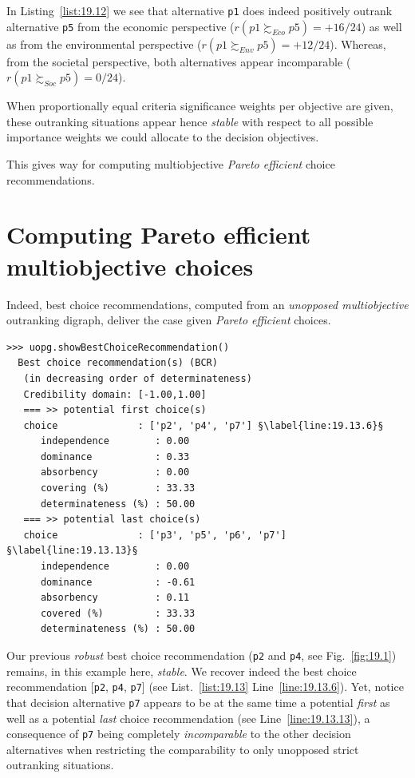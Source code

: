 In Listing~\vref{list:19.12} we see that alternative \texttt{p1} does indeed positively outrank alternative \texttt{p5} from the economic perspective ($r(p1 \succsim_{Eco} p5) = +16/24$) as well as from the environmental perspective ($r(p1 \succsim_{Env} p5) = +12/24$). Whereas, from the societal perspective, both alternatives appear incomparable ($r(p1 \succsim_{Soc} p5) = 0/24$).

When proportionally equal criteria significance weights per objective are given, these outranking situations appear hence \emph{stable} with respect to all possible importance weights we could allocate to the decision objectives.

This gives way for computing multiobjective \emph{Pareto efficient} choice recommendations. 

\section{Computing Pareto efficient multiobjective choices}
\label{sec:19.6}

Indeed, best choice recommendations, computed from an \emph{unopposed multiobjective} outranking digraph, deliver the case given \emph{Pareto efficient} choices. 
\begin{lstlisting}[caption={Pareto efficient multiobjective choice},label=list:19.13]
>>> uopg.showBestChoiceRecommendation()
  Best choice recommendation(s) (BCR)
   (in decreasing order of determinateness)   
   Credibility domain: [-1.00,1.00]
   === >> potential first choice(s)
   choice              : ['p2', 'p4', 'p7'] §\label{line:19.13.6}§
      independence        : 0.00
      dominance           : 0.33
      absorbency          : 0.00
      covering (%)        : 33.33
      determinateness (%) : 50.00
   === >> potential last choice(s) 
   choice              : ['p3', 'p5', 'p6', 'p7'] §\label{line:19.13.13}§
      independence        : 0.00
      dominance           : -0.61
      absorbency          : 0.11
      covered (%)         : 33.33
      determinateness (%) : 50.00
\end{lstlisting}

Our previous \emph{robust} best choice recommendation (\texttt{p2} and \texttt{p4}, see Fig.~\vref{fig:19.1}) remains, in this example here, \emph{stable}. We recover indeed the best choice recommendation [\texttt{p2}, \texttt{p4}, \texttt{p7}] (see List.~\vref{list:19.13} Line~\ref{line:19.13.6}). Yet, notice that decision alternative \texttt{p7} appears to be at the same time a potential \emph{first} as well as a potential \emph{last} choice recommendation (see Line~\ref{line:19.13.13}), a consequence of \texttt{p7} being completely \emph{incomparable} to the other decision alternatives when restricting the comparability to only unopposed strict outranking situations. 

